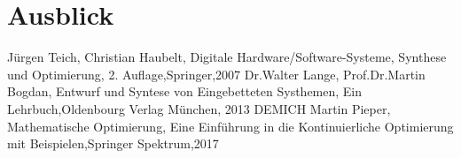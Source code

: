 \documentclass[conference]{IEEEtran}
\begin{document}
\section{Ausblick}

\begin{thebibliography}{00}
 Jürgen Teich, Christian Haubelt, Digitale Hardware/Software-Systeme, Synthese und Optimierung, 2. Auflage,Springer,2007
 Dr.Walter Lange, Prof.Dr.Martin Bogdan, Entwurf und Syntese von Eingebetteten Systhemen, Ein Lehrbuch,Oldenbourg Verlag München, 2013
 DEMICH
 Martin Pieper, Mathematische Optimierung, Eine Einführung in die Kontinuierliche Optimierung mit Beispielen,Springer Spektrum,2017
\end{thebibliography}
\vspace{12pt}
\end{document}
